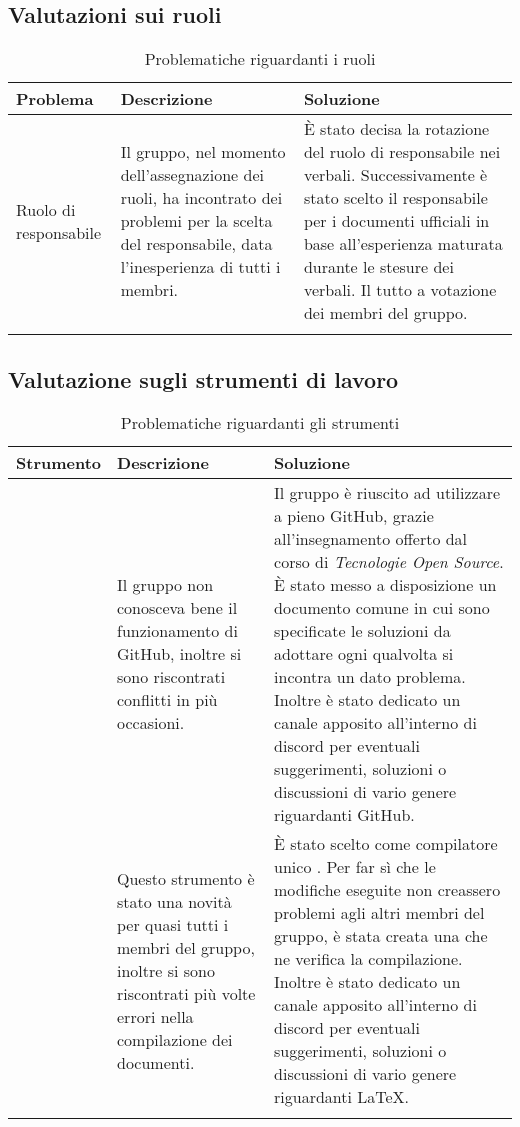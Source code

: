 	\subsection{Valutazioni sui ruoli}
	\begin{center}
		\begin{longtable}{|C{2cm}|p{6cm}|p{6cm}|}
			\hline
			\textbf{Problema} & \textbf{Descrizione} & \textbf{Soluzione}  \\ 			
			\hline
			\endhead
			
			\hline
			Ruolo di responsabile & Il gruppo, nel momento dell'assegnazione dei ruoli, ha incontrato dei problemi per la scelta del responsabile, data l'inesperienza di tutti i membri. & È stato decisa la rotazione del ruolo di responsabile nei verbali. Successivamente è stato scelto il responsabile per i documenti ufficiali in base all'esperienza maturata durante le stesure dei verbali. Il tutto a votazione dei membri del gruppo. \\
			\hline
			
			\hiderowcolors
			\caption{Problematiche riguardanti i ruoli}		
		\end{longtable}	
	\end{center}
	\subsection{Valutazione sugli strumenti di lavoro}
	\begin{center}
		\begin{longtable}{|C{2cm}|p{6cm}|p{6cm}|}
			\hline
			\textbf{Strumento} & \textbf{Descrizione} & \textbf{Soluzione}  \\ 			
			\hline
			\endhead
			
			\hline
			 & Il gruppo non conosceva bene il funzionamento di GitHub, inoltre si sono riscontrati conflitti in più occasioni. & Il gruppo è riuscito ad utilizzare a pieno GitHub, grazie all'insegnamento offerto dal corso di \textit{Tecnologie Open Source}. È stato messo a disposizione un documento comune in cui sono specificate le soluzioni da adottare ogni qualvolta si incontra un dato problema. Inoltre è stato dedicato un canale apposito all'interno di discord per eventuali suggerimenti, soluzioni o discussioni di vario genere riguardanti GitHub.\\
			\hline	
			\glock{\LaTeX} & Questo strumento è stato una novità per quasi tutti i membri del gruppo, inoltre si sono riscontrati più volte errori nella compilazione dei documenti. & È stato scelto come compilatore unico . Per far sì che le modifiche eseguite non creassero problemi agli altri membri del gruppo, è stata creata una  che ne verifica la compilazione. Inoltre è stato dedicato un canale apposito all'interno di discord per eventuali suggerimenti, soluzioni o discussioni di vario genere riguardanti \LaTeX. \\
			\hline	
			
			\hiderowcolors
			\caption{Problematiche riguardanti gli strumenti}		
		\end{longtable}	
	\end{center}